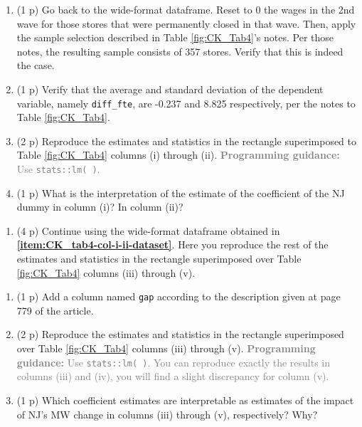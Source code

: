 \documentclass[
]{article}
\providecommand{\tightlist}{%
  \setlength{\itemsep}{0pt}\setlength{\parskip}{0pt}}
\begin{document}
\begin{enumerate}
\def\labelenumi{\alph{enumi}.}
\item
  (1 p) Go back to the wide-format dataframe. Reset to 0 the wages in
  the 2nd wave for those stores that were permanently closed in that
  wave. Then, apply the sample selection described in Table
  \ref{fig:CK_Tab4}'s notes. Per those notes, the resulting sample
  consists of 357 stores. Verify that this is indeed the
  case.\label{item:CK_tab4-col-i-ii-dataset}
\item
  (1 p) Verify that the average and standard deviation of the dependent
  variable, namely \texttt{diff\_fte}, are -0.237 and 8.825
  respectively, per the notes to Table \ref{fig:CK_Tab4}.
\item
  (2 p) Reproduce the estimates and statistics in the rectangle
  superimposed to Table \ref{fig:CK_Tab4} columns (i) through (ii).
  \textcolor{gray}{\textbf{Programming guidance:} Use \texttt{stats::lm( )}.}
\item
  (1 p) What is the interpretation of the estimate of the coefficient of
  the NJ dummy in column (i)? In column (ii)?
\end{enumerate}

\begin{enumerate}
\def\labelenumi{\arabic{enumi}.}
\setcounter{enumi}{18}
\tightlist
\item
  (4 p) Continue using the wide-format dataframe obtained in
  \textbf{\ref{item:CK_tab4-col-i-ii-dataset}}. Here you reproduce the
  rest of the estimates and statistics in the rectangle superimposed
  over Table \ref{fig:CK_Tab4} columns (iii) through (v).
\end{enumerate}

\begin{enumerate}
\def\labelenumi{\alph{enumi}.}
\item
  (1 p) Add a column named \texttt{gap} according to the description
  given at page 779 of the article.
\item
  (2 p) Reproduce the estimates and statistics in the rectangle
  superimposed over Table \ref{fig:CK_Tab4} columns (iii) through (v).
  \textcolor{gray}{\textbf{Programming guidance:} Use \texttt{stats::lm( )}. You can reproduce exactly the results in columns (iii) and (iv), you will find a slight discrepancy for column (v).}
\item
  (1 p) Which coefficient estimates are interpretable as estimates of
  the impact of NJ's MW change in columns (iii) through (v),
  respectively? Why?
\end{enumerate}
\end{document}

